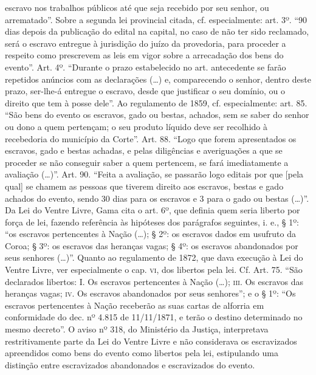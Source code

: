 {  escravo nos trabalhos públicos até que seja recebido por seu senhor,
  ou arrematado''. Sobre a segunda lei provincial citada, cf.
  especialmente: art. 3º. ``90 dias depois da publicação do edital na
  capital, no caso de não ter sido reclamado, será o escravo entregue à
  jurisdição do juízo da provedoria, para proceder a respeito como
  prescrevem as leis em vigor sobre a arrecadação dos bens do evento''.
  Art. 4º. ``Durante o prazo estabelecido no art. antecedente se farão
  repetidos anúncios com as declarações (\ldots{}) e, comparecendo o senhor,
  dentro deste prazo, ser-lhe-á entregue o escravo, desde que justificar
  o seu domínio, ou o direito que tem à posse dele''. Ao regulamento de
  1859, cf. especialmente: art. 85. ``São bens do evento os escravos,
  gado ou bestas, achados, sem se saber do senhor ou dono a quem
  pertençam; o seu produto líquido deve ser recolhido à recebedoria do
  município da Corte''. Art. 88. ``Logo que forem apresentados os escravos,
  gado e bestas achadas, e pelas diligências e averiguações a que se
  proceder se não conseguir saber a quem pertencem, se fará
  imediatamente a avaliação (\ldots{})''. Art. 90. ``Feita a avaliação, se
  passarão logo editais por que {[}pela qual{]} se chamem as pessoas que
  tiverem direito aos escravos, bestas e gado achados do evento, sendo
  30 dias para os escravos e 3 para o gado ou bestas (\ldots{})''. Da Lei do
  Ventre Livre, Gama cita o art. 6º, que definia quem seria liberto por
  força de lei, fazendo referência às hipóteses dos parágrafos
  seguintes, i. e., § 1º: ``os escravos pertencentes à Nação (\ldots{}); §
  2º: os escravos dados em usufruto da Coroa; § 3º: os escravos das
  heranças vagas; § 4º: os escravos abandonados por seus senhores
  (\ldots{})''. Quanto ao regulamento de 1872, que dava execução à Lei do
  Ventre Livre, ver especialmente o cap. \textsc{vi}, dos libertos pela lei. Cf.
  Art. 75. ``São declarados libertos: I. Os escravos pertencentes à Nação
  (\ldots{}); \textsc{iii}. Os escravos das heranças vagas; \textsc{iv}. Os escravos
  abandonados por seus senhores''; e o § 1º: ``Os escravos pertencentes à
  Nação receberão as suas cartas de alforria em conformidade do dec. nº
  4.815 de 11/11/1871, e terão o destino determinado no mesmo decreto''.
  O aviso nº 318, do Ministério da Justiça, interpretava restritivamente
  parte da Lei do Ventre Livre e não considerava os escravizados
  apreendidos como bens do evento como libertos pela lei, estipulando
  uma distinção entre escravizados abandonados e escravizados do evento.
}
